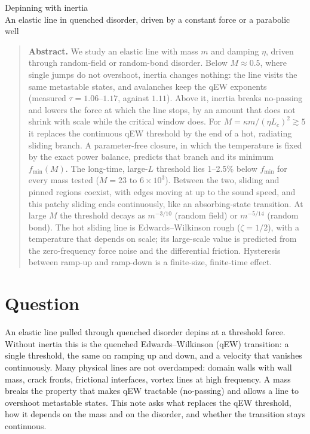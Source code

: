 \documentclass[10pt,a4paper]{article}
\begin{document}
\begin{center}
{\Large Depinning with inertia}\\[3pt]
{\small An elastic line in quenched disorder, driven by a constant force or a parabolic well}
\end{center}

\begin{quote}\small
\textbf{Abstract.}
We study an elastic line with mass $m$ and damping $\eta$, driven through random-field or random-bond disorder.
Below $M\approx0.5$, where single jumps do not overshoot, inertia changes nothing: the line visits the same metastable states, and avalanches keep the qEW exponents (measured $\tau=1.06$--$1.17$, against $1.11$). Above it, inertia breaks no-passing and lowers the force at which the line stops, by an amount that does not shrink with scale while the critical window does.
For $M=\kappa m/(\eta L_c)^2\gtrsim5$ it replaces the continuous qEW threshold by the end of a hot, radiating sliding branch.
A parameter-free closure, in which the temperature is fixed by the exact power balance, predicts that branch and its minimum $f_{\min}(M)$.
The long-time, large-$L$ threshold lies 1--2.5\% below $f_{\min}$ for every mass tested ($M=23$ to $6\times10^3$).
Between the two, sliding and pinned regions coexist, with edges moving at up to the sound speed, and this patchy sliding ends continuously, like an absorbing-state transition.
At large $M$ the threshold decays as $m^{-3/10}$ (random field) or $m^{-5/14}$ (random bond).
The hot sliding line is Edwards--Wilkinson rough ($\zeta=1/2$), with a temperature that depends on scale; its large-scale value is predicted from the zero-frequency force noise and the differential friction.
Hysteresis between ramp-up and ramp-down is a finite-size, finite-time effect.
\end{quote}

\section{Question}

An elastic line pulled through quenched disorder depins at a threshold force.
Without inertia this is the quenched Edwards--Wilkinson (qEW) transition: a single threshold, the same on ramping up and down, and a velocity that vanishes continuously.
Many physical lines are not overdamped: domain walls with wall mass, crack fronts, frictional interfaces, vortex lines at high frequency.
A mass breaks the property that makes qEW tractable (no-passing) and allows a line to overshoot metastable states.
This note asks what replaces the qEW threshold, how it depends on the mass and on the disorder, and whether the transition stays continuous.
\end{document}
